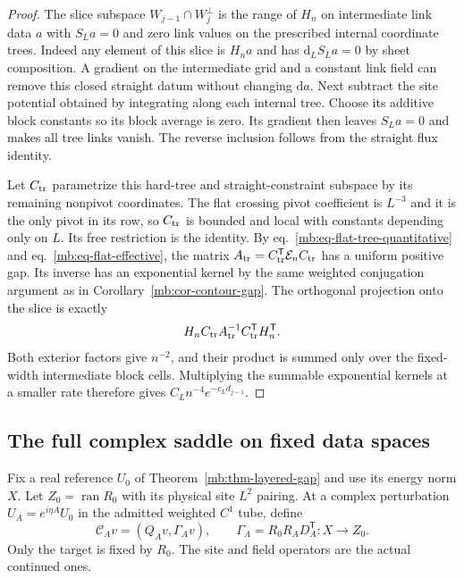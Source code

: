 \documentclass[11pt,letterpaper,reqno]{amsart}
\numberwithin{equation}{section}
\renewcommand{\eqref}[1]{\textup{eq.~\ref{#1}}}
\theoremstyle{definition}
\theoremstyle{remark}
\begin{document}
\begin{proof}
The slice subspace \(W_{j-1}\cap W_j^\perp\) is the
range of \(H_n\) on intermediate link data \(a\) with
\(S_La=0\) and zero link values on the prescribed
internal coordinate trees. Indeed any element of this
slice is \(H_n a\) and has
\(\mathrm d_L S_L a=0\) by sheet composition. A
gradient on the intermediate grid and a constant link
field can remove this closed straight datum without
changing \(\mathrm da\). Next subtract the site
potential obtained by integrating along each internal
tree. Choose its additive block constants so its
block average is zero. Its gradient then leaves
\(S_La=0\) and makes all tree links vanish.
The reverse inclusion follows from the straight
flux identity.

Let \(C_{\rm tr}\) parametrize this hard-tree and
straight-constraint subspace by its remaining
nonpivot coordinates. The flat crossing pivot
coefficient is \(L^{-3}\) and it is the only pivot
in its row, so \(C_{\rm tr}\) is bounded and local
with constants depending only on \(L\).
Its free restriction is the identity. By
\eqref{mb:eq-flat-tree-quantitative} and
\eqref{mb:eq-flat-effective}, the matrix
\(A_{\rm tr}=C_{\rm tr}^{\mathsf T}\mathcal E_n C_{\rm tr}\)
has a uniform positive gap. Its inverse has an
exponential kernel by the same weighted conjugation
argument as in Corollary~\ref{mb:cor-contour-gap}.
The orthogonal projection onto the slice is exactly
\[
 H_n C_{\rm tr} A_{\rm tr}^{-1}
                         C_{\rm tr}^{\mathsf T}H_n^{\mathsf T}.
\]
Both exterior factors give \(n^{-2}\), and their
product is summed only over the fixed-width
intermediate block cells. Multiplying the summable
exponential kernels at a smaller rate therefore
gives \(C_L n^{-4}e^{-c_Ld_{j-1}}\).
\end{proof}


\subsection{The full complex saddle on fixed data spaces}

Fix a real reference \(U_0\) of Theorem~\ref{mb:thm-layered-gap}
and use its energy norm \(X\). Let \(Z_0=\operatorname{ran}R_0\)
with its physical site \(L^2\) pairing. At a complex perturbation
\(U_A=e^{i\eta A}U_0\) in the admitted weighted \(C^1\) tube,
define
\[
 \mathcal C_A v=(Q_Av,\Gamma_Av),\qquad
 \Gamma_A=R_0 R_A D_A^{\mathsf T}:X\longrightarrow Z_0 .
\]
Only the target is fixed by \(R_0\). The site and field
operators are the actual continued ones.
\end{document}
